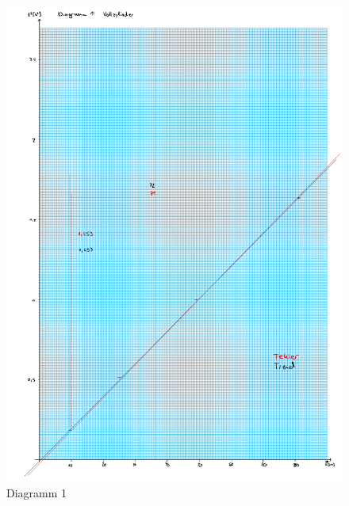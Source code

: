 \begin{figure}[h!]
    \centering
    \includegraphics[page=1, width=.95\textwidth,]{Diagramme15.pdf}
    \caption{Diagramm 1}
\end{figure}
\newpage
